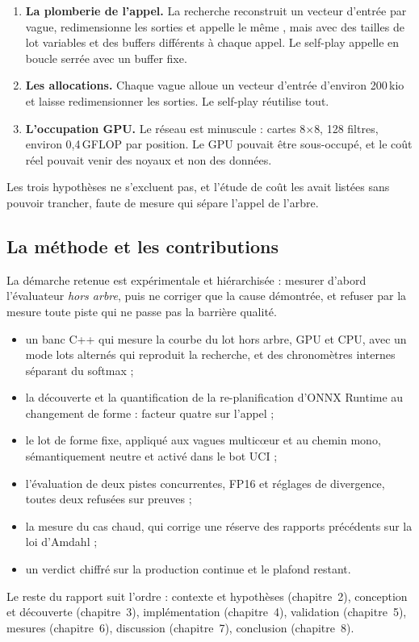 \begin{enumerate}[leftmargin=1.4em,itemsep=3pt]
  \item \textbf{La plomberie de l'appel.} La recherche reconstruit un vecteur
  d'entr\'ee par vague, redimensionne les sorties et appelle le m\^eme
  , mais avec des tailles de lot variables et des
  buffers diff\'erents \`a chaque appel. Le self-play appelle en boucle serr\'ee
  avec un buffer fixe.
  \item \textbf{Les allocations.} Chaque vague alloue un vecteur d'entr\'ee
  d'environ 200\,kio et laisse  redimensionner les
  sorties. Le self-play r\'eutilise tout.
  \item \textbf{L'occupation GPU.} Le r\'eseau est minuscule : cartes 8$\times$8,
  128 filtres, environ 0,4\,GFLOP par position. Le GPU pouvait \^etre sous-occup\'e,
  et le co\^ut r\'eel pouvait venir des noyaux et non des donn\'ees.
\end{enumerate}

Les trois hypoth\`eses ne s'excluent pas, et l'\'etude de co\^ut
 les avait list\'ees sans pouvoir
trancher, faute de mesure qui s\'epare l'appel de l'arbre.

\subsection{La m\'ethode et les contributions}

La d\'emarche retenue est exp\'erimentale et hi\'erarchis\'ee : mesurer d'abord
l'\'evaluateur \emph{hors arbre}, puis ne corriger que la cause d\'emontr\'ee,
et refuser par la mesure toute piste qui ne passe pas la barri\`ere qualit\'e.

\begin{resume}
\begin{itemize}[leftmargin=1.2em,itemsep=2pt]
  \item un banc C++  qui mesure la courbe du lot
  hors arbre, GPU et CPU, avec un mode \og lots altern\'es \fg{} qui reproduit
  la recherche, et des chronom\`etres internes s\'eparant 
  du softmax ;
  \item la d\'ecouverte et la quantification de la re-planification d'ONNX
  Runtime au changement de forme : facteur quatre sur l'appel ;
  \item le lot de forme fixe, appliqu\'e aux vagues multic\oe{}ur et au chemin
  mono, s\'emantiquement neutre et activ\'e dans le bot UCI ;
  \item l'\'evaluation de deux pistes concurrentes, FP16 et r\'eglages de
  divergence, toutes deux refus\'ees sur preuves ;
  \item la mesure du cas chaud, qui corrige une r\'eserve des rapports
  pr\'ec\'edents sur la loi d'Amdahl ;
  \item un verdict chiffr\'e sur la production continue et le plafond restant.
\end{itemize}
\end{resume}

Le reste du rapport suit l'ordre : contexte et hypoth\`eses (chapitre~2),
conception et d\'ecouverte (chapitre~3), impl\'ementation (chapitre~4),
validation (chapitre~5), mesures (chapitre~6), discussion (chapitre~7),
conclusion (chapitre~8).
